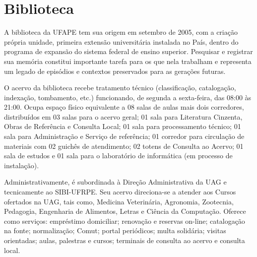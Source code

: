 \documentclass[
	12pt,				%
	openright,			%
  oneside,     %
	a4paper,			%
 hyphens,
	chapter=TITLE,		%
	english,			%
	french,				%
	spanish,			%
	brazil				%
	]{abntex2}
\begin{document}
\section{Biblioteca}

A biblioteca da UFAPE tem sua origem em setembro de 2005, com a criação própria unidade, primeira extensão universitária instalada no País, dentro do programa de expansão do sistema federal de ensino superior. Pesquisar e registrar sua memória constitui importante tarefa para os que nela trabalham e representa um legado de episódios e contextos preservados para as gerações futuras.

O acervo da biblioteca recebe tratamento técnico (classificação, catalogação, indexação, tombamento, etc.) funcionando, de segunda a sexta-feira, das 08:00 às 21:00. Ocupa espaço físico equivalente a 08 salas de aulas mais dois corredores, distribuídos em 03 salas para o acervo geral; 01 sala para Literatura Cinzenta, Obras de Referência e Consulta Local; 01 sala para processamento técnico; 01 sala para Administração e Serviço de referência; 01 corredor para circulação de materiais com 02 guichês de atendimento; 02 totens de Consulta ao Acervo; 01 sala de estudos e 01 sala para o laboratório de informática (em processo de instalação).

Administrativamente, é subordinada à Direção Administrativa da UAG e tecnicamente ao SIBI-UFRPE. Seu acervo direciona-se a atender aos Cursos ofertados na UAG, tais como, Medicina Veterinária, Agronomia, Zootecnia, Pedagogia, Engenharia de Alimentos, Letras e Ciência da Computação. Oferece como serviços: empréstimo domiciliar; renovação e reservas on-line; catalogação na fonte; normalização; Comut; portal periódicos; multa solidária; visitas orientadas; aulas, palestras e cursos; terminais de consulta ao acervo e consulta local. 
\end{document}
